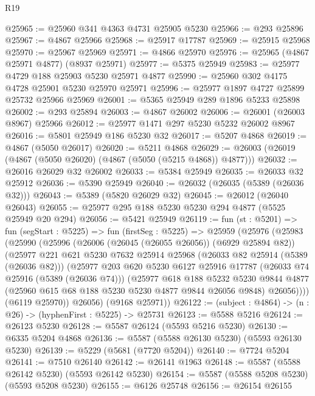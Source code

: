 \begin{lexlean}{R19}
\begin{coremodule}
@25965 := @25960 @341 @4363 @4731 @25905 @5230
@25966 := @293 @25896
@25967 := @4867 @25966
@25968 := @25917 @17787
@25969 := @25915 @25968
@25970 := @25967 @25969
@25971 := @4866 @25970
@25976 := @25965 (@4867 @25971 @4877) (@8937 @25971)
@25977 := @5375 @25949
@25983 := @25977 @4729 @188 @25903 @5230 @25971 @4877
@25990 := @25960 @302 @4175 @4728 @25901 @5230 @25970 @25971
@25996 := @25977 @1897 @4727 @25899 @25732 @25966 @25969
@26001 := @5365 @25949 @289 @1896 @5233 @25898
@26002 := @293 @25894
@26003 := @4867 @26002
@26006 := @26001 (@26003 @8967) @25966
@26012 := @25977 @1471 @297 @5230 @5232 @26002 @8967
@26016 := @5801 @25949 @186 @5230 @32
@26017 := @5207 @4868
@26019 := @4867 (@5050 @26017)
@26020 := @5211 @4868
@26029 := @26003 (@26019 (@4867 (@5050 @26020) (@4867 (@5050 (@5215 @4868)) @4877)))
@26032 := @26016 @26029 @32 @26002
@26033 := @5384 @25949
@26035 := @26033 @32 @25912
@26036 := @5390 @25949
@26040 := @26032 (@26035 (@5389 (@26036 @32)))
@26043 := @5389 (@5820 @26029 @32)
@26045 := @26012 (@26040 @26043)
@26055 := @25977 @295 @188 @5230 @5230 @294 @4877 (@5525 @25949 @20 @294)
@26056 := @5421 @25949
@26119 := fun (st : @5201) =>
  fun (segStart : @5225) =>
  fun (firstSeg : @5225) =>
  @25959
    (@25976
      (@25983
        (@25990
          (@25996
            (@26006 (@26045 (@26055 @26056)) (@6929 @25894 @82))
            (@25977
              @221
              @621
              @5230
              @7632
              @25914
              @25968
              (@26033 @82 @25914 (@5389 (@26036 @82)))
              (@25977
                @203
                @620
                @5230
                @6127
                @25916
                @17787
                (@26033 @74 @25916 (@5389 (@26036 @74)))
                (@25977
                  @618
                  @188
                  @5232
                  @5230
                  @9844
                  @4877
                  (@25960 @615 @68 @188 @5230 @5230 @4877 @9844 @26056 @9848)
                  @26056))))
          (@6119 @25970))
        @26056)
      (@9168 @25971))
@26122 := (subject : @4864) -> (n : @26) -> (hyphenFirst : @5225) -> @25731
@26123 := @5588 @5216
@26124 := @26123 @5230
@26128 := @5587 @26124 (@5593 @5216 @5230)
@26130 := @6335 @5204 @4868
@26136 := @5587 (@5588 @26130 @5230) (@5593 @26130 @5230)
@26139 := @5229 (@5681 (@7720 @5204))
@26140 := @7724 @5204
@26141 := @7510 @26140
@26142 := @26141 @1963
@26148 := @5587 (@5588 @26142 @5230) (@5593 @26142 @5230)
@26154 := @5587 (@5588 @5208 @5230) (@5593 @5208 @5230)
@26155 := @6126 @25748
@26156 := @26154 @26155

\end{coremodule}
\end{lexlean}
